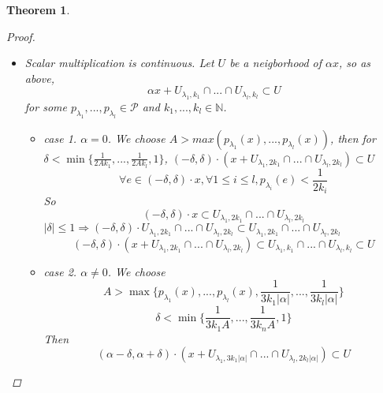 \documentclass{article}
\newtheorem*{theorem}{Theorem}
\begin{document}
\begin{theorem}
\begin{proof}
\begin{enumerate}
\begin{itemize}
                $x + y + (U_{\lambda_1, k_1} \cap ... \cap U_{\lambda_l, k_l}) \subset U$.
                Now let 
                \[U_1 = x + U_{\lambda_1, 2k_1} \cap ... \cap U_{\lambda_l, 2k_l}\textnormal{(open neigborhood of x)}\]
                \[U_2 = y + U_{\lambda_1, 2k_1} \cap ... \cap U_{\lambda_l, 2k_l}\textnormal{(open neigborhood of y)}\]
                Then $U_1 + U_2 \subset U$.
                If $z_1, z_2 \in U_{\lambda_1, 2k_1} \cap ... \cap U_{\lambda_l, 2k_l}$, i.e. 
                $\forall 1 \le i \le l, p_{\lambda_i}(z_1) < \frac{1}{2k_i}, p_{\lambda_i}(z_2) < \frac{1}{2k_i}$, 
                then $\forall 1 \le i \le l, p_{\lambda_i}(z_1 + z_2) < \frac{1}{k_i}$.
                \item Scalar multiplication is continuous. Let $U$ be a neigborhood of $\alpha x$, so as above,
                \[ \alpha x + U_{\lambda_1, k_1} \cap ... \cap U_{\lambda_l, k_l} \subset U \]
                for some $p_{\lambda_1}, ..., p_{\lambda_l} \in \mathcal{P}$ and $k_1, ..., k_l \in \mathbb{N}$.
                \begin{itemize}
                    \item case 1. $\alpha = 0$. We choose $A > max(p_{\lambda_1}(x), ..., p_{\lambda_l}(x))$,
                    then for $\delta < \min{\{\frac{1}{2Ak_1}, ..., \frac{1}{2Ak_l}, 1\}}$, $(-\delta, \delta)\cdot(x + U_{\lambda_1, 2k_1} \cap ...\cap U_{\lambda_l, 2k_l}) \subset U$
                    \[\forall e \in (-\delta, \delta) \cdot x, \forall 1 \le i \le l, p_{\lambda_i}(e) < \frac{1}{2k_i}\]
                    So \[(-\delta, \delta) \cdot x \subset U_{\lambda_1, 2k_1} \cap ...\cap U_{\lambda_l, 2k_l}\]
                    $|\delta| \le 1 \Rightarrow (-\delta, \delta) \cdot U_{\lambda_1, 2k_1} \cap ...\cap U_{\lambda_l, 2k_l} \subset U_{\lambda_1, 2k_1} \cap ...\cap U_{\lambda_l, 2k_l}$
                    \[(-\delta, \delta)\cdot(x + U_{\lambda_1, 2k_1} \cap ...\cap U_{\lambda_l, 2k_l}) \subset U_{\lambda_1, k_1} \cap ...\cap U_{\lambda_l, k_l} \subset U\]
                    \item case 2. $\alpha \ne 0$. We choose 
                    \[A > \max{\{p_{\lambda_1}(x), ..., p_{\lambda_l}(x),\frac{1}{3k_1|\alpha|}, ..., \frac{1}{3k_l|\alpha|}\}}\]
                    \[\delta < \min{\{\frac{1}{3k_1A}, ..., \frac{1}{3k_nA}, 1}\}\]
                    Then
                    \[ (\alpha - \delta, \alpha + \delta) \cdot (x + U_{\lambda_1, 3k_1|\alpha|} \cap ... \cap U_{\lambda_l, 2k_l|\alpha|}) \subset U\]
                \end{itemize}

\end{itemize}
\end{enumerate}
\end{proof}
\end{theorem}
\end{document}
